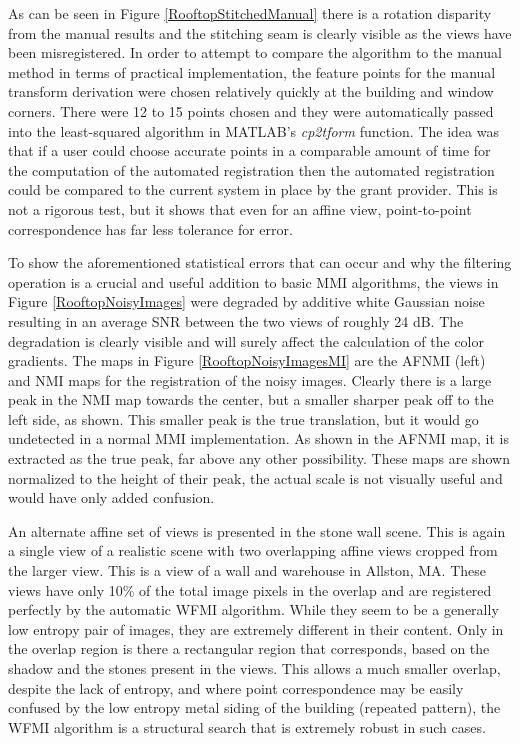As can be seen in Figure \ref{RooftopStitchedManual} there is a rotation disparity from the manual results and the stitching seam is clearly visible as the views have been misregistered. In order to attempt to compare the algorithm to the manual method in terms of practical implementation, the feature points for the manual transform derivation were chosen relatively quickly at the building and window corners. There were 12 to 15 points chosen and they were automatically passed into the least-squared algorithm in MATLAB\textsuperscript{\textregistered}'s \textit{cp2tform} function. The idea was that if a user could choose accurate points in a comparable amount of time for the computation of the automated registration then the automated registration could be compared to the current system in place by the grant provider. This is not a rigorous test, but it shows that even for an affine view, point-to-point correspondence has far less tolerance for error.

To show the aforementioned statistical errors that can occur and why the filtering operation is a crucial and useful addition to basic MMI algorithms, the views in Figure \ref{RooftopNoisyImages} were degraded by additive white Gaussian noise resulting in an average SNR between the two views of roughly 24 dB. The degradation is clearly visible and will surely affect the calculation of the color gradients. The maps in Figure \ref{RooftopNoisyImagesMI} are the AFNMI (left) and NMI maps for the registration of the noisy images. Clearly there is a large peak in the NMI map towards the center, but a smaller sharper peak off to the left side, as shown. This smaller peak is the true translation, but it would go undetected in a normal MMI implementation. As shown in the AFNMI map, it is extracted as the true peak, far above any other possibility. These maps are shown normalized to the height of their peak, the actual scale is not visually useful and would have only added confusion.

An alternate affine set of views is presented in the stone wall scene. This is again a single view of a realistic scene with two overlapping affine views cropped from the larger view. This is a view of a wall and warehouse in Allston, MA. These views have only 10\% of the total image pixels in the overlap and are registered perfectly by the automatic WFMI algorithm. While they seem to be a generally low entropy pair of images, they are extremely different in their content. Only in the overlap region is there a rectangular region that corresponds, based on the shadow and the stones present in the views. This allows a much smaller overlap, despite the lack of entropy, and where point correspondence may be easily confused by the low entropy metal siding of the building (repeated pattern), the WFMI algorithm is a structural search that is extremely robust in such cases.

